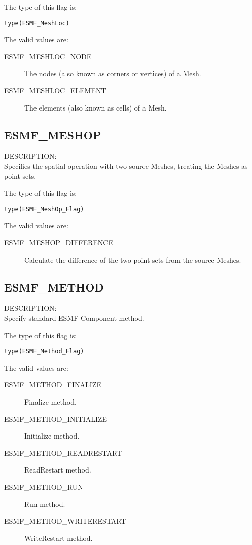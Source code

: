 The type of this flag is:

{\tt type(ESMF\_MeshLoc)}

The valid values are:
\begin{description}

\item [ESMF\_MESHLOC\_NODE]
         The nodes (also known as corners or vertices) of a Mesh. 

\item [ESMF\_MESHLOC\_ELEMENT]
         The elements (also known as cells) of a Mesh. 
\end{description}


\subsection{ESMF\_MESHOP}
\label{const:meshop}
{\sf DESCRIPTION:\\}  
Specifies the spatial operation with two source Meshes, treating the Meshes as point sets.

The type of this flag is:

{\tt type(ESMF\_MeshOp\_Flag)}

The valid values are:
\begin{description}

\item [ESMF\_MESHOP\_DIFFERENCE]
         Calculate the difference of the two point sets from the source Meshes.
\end{description}

\subsection{ESMF\_METHOD}
\label{const:method}

{\sf DESCRIPTION:\\}  
Specify standard ESMF Component method.

The type of this flag is:

{\tt type(ESMF\_Method\_Flag)}

The valid values are:
\begin{description}
\item [ESMF\_METHOD\_FINALIZE]
      Finalize method.
\item [ESMF\_METHOD\_INITIALIZE]
      Initialize method.
\item [ESMF\_METHOD\_READRESTART]
      ReadRestart method.
\item [ESMF\_METHOD\_RUN]
      Run method.
\item [ESMF\_METHOD\_WRITERESTART]
      WriteRestart method.
\end{description}


